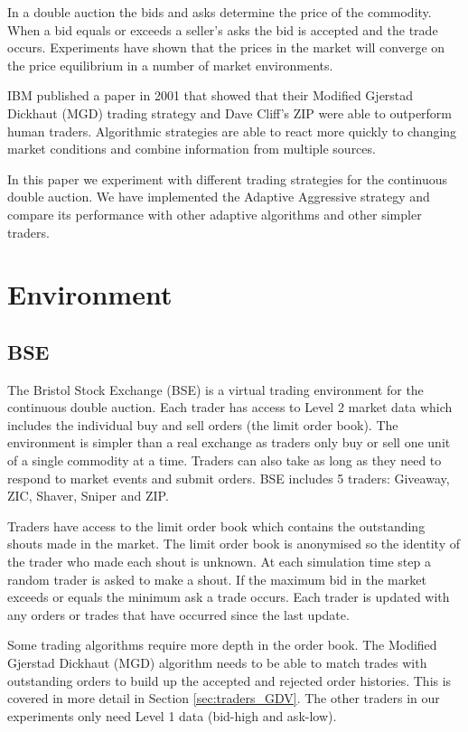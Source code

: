 \documentclass[preprint]{acm_proc_article-sp} %
\begin{document}
In a double auction the bids and asks determine the price of the commodity.
When a bid equals or exceeds a seller's asks the bid is accepted and the trade
occurs. Experiments have shown  that the prices in the market will
 converge on the price equilibrium in a number of market
environments\cite{smith_1962}.

IBM published a paper in 2001 that showed that their Modified Gjerstad Dickhaut (MGD) trading strategy and
Dave Cliff's ZIP were able to outperform human traders\cite{ibm_human}.
Algorithmic strategies are able to react more quickly to changing market
conditions and combine information from multiple sources.

In this paper we experiment with different trading strategies for the
continuous double auction.
We have implemented the Adaptive Aggressive \cite{AA_thesis} strategy and compare its performance 
with other adaptive algorithms and other simpler traders.\\



\section{Environment} \label{sec:environment}
\subsection{BSE} \label{sec:BSE}
The Bristol Stock Exchange (BSE) is a virtual trading environment for the
continuous double auction. Each trader has access to Level 2 market data which
includes the individual buy and sell orders (the limit order book). The
environment is simpler than a real exchange as traders only buy or sell one
unit of a single commodity at a time. Traders can also take as long as they
need to respond to market events and submit orders. BSE includes 5 traders: Giveaway, ZIC, Shaver, Sniper and ZIP.

Traders have access to the limit order book which contains the outstanding
shouts made in the market. The limit order book is anonymised so the identity
of the trader who made each shout is unknown. At each simulation time step a
random trader is asked to make a shout. If the maximum bid in the market
exceeds or equals the minimum ask a trade occurs. Each trader is updated with
any orders or trades that have occurred since the last update.

Some trading algorithms require more depth in the order book. The Modified
Gjerstad Dickhaut (MGD) algorithm needs to be able to match trades with
outstanding orders to build up the accepted and rejected order histories.
This is covered in more detail in Section \ref{sec:traders_GDV}. The
other traders in our experiments only need Level 1 data
(bid-high and ask-low).
\end{document}
